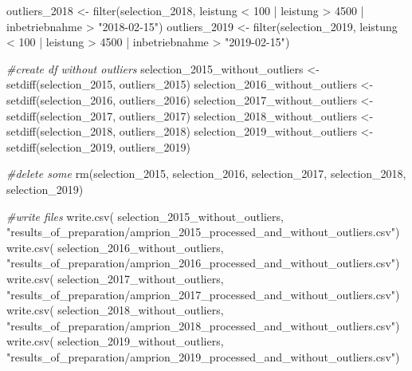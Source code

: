 \documentclass[a4paper,11pt]{article}
\newenvironment{Shaded}{\begin{snugshade}}{\end{snugshade}}
\newcommand{\CommentTok}[1]{\textcolor[rgb]{0.56,0.35,0.01}{\textit{#1}}}
\newcommand{\DecValTok}[1]{\textcolor[rgb]{0.00,0.00,0.81}{#1}}
\newcommand{\FunctionTok}[1]{\textcolor[rgb]{0.00,0.00,0.00}{#1}}
\newcommand{\NormalTok}[1]{#1}
\newcommand{\OtherTok}[1]{\textcolor[rgb]{0.56,0.35,0.01}{#1}}
\newcommand{\SpecialCharTok}[1]{\textcolor[rgb]{0.00,0.00,0.00}{#1}}
\newcommand{\StringTok}[1]{\textcolor[rgb]{0.31,0.60,0.02}{#1}}
\begin{document}
\begin{Shaded}
\begin{Highlighting}[]
\NormalTok{outliers\_2018 }\OtherTok{\textless{}{-}} \FunctionTok{filter}\NormalTok{(selection\_2018, leistung }\SpecialCharTok{\textless{}} \DecValTok{100} \SpecialCharTok{|}\NormalTok{ leistung }\SpecialCharTok{\textgreater{}} \DecValTok{4500} \SpecialCharTok{|} 
\NormalTok{                          inbetriebnahme }\SpecialCharTok{\textgreater{}} \StringTok{"2018{-}02{-}15"}\NormalTok{)}
\NormalTok{outliers\_2019 }\OtherTok{\textless{}{-}} \FunctionTok{filter}\NormalTok{(selection\_2019, leistung }\SpecialCharTok{\textless{}} \DecValTok{100} \SpecialCharTok{|}\NormalTok{ leistung }\SpecialCharTok{\textgreater{}} \DecValTok{4500} \SpecialCharTok{|} 
\NormalTok{                          inbetriebnahme }\SpecialCharTok{\textgreater{}} \StringTok{"2019{-}02{-}15"}\NormalTok{)}

\CommentTok{\#create df without outliers}
\NormalTok{selection\_2015\_without\_outliers }\OtherTok{\textless{}{-}} \FunctionTok{setdiff}\NormalTok{(selection\_2015, outliers\_2015)}
\NormalTok{selection\_2016\_without\_outliers }\OtherTok{\textless{}{-}} \FunctionTok{setdiff}\NormalTok{(selection\_2016, outliers\_2016)}
\NormalTok{selection\_2017\_without\_outliers }\OtherTok{\textless{}{-}} \FunctionTok{setdiff}\NormalTok{(selection\_2017, outliers\_2017)}
\NormalTok{selection\_2018\_without\_outliers }\OtherTok{\textless{}{-}} \FunctionTok{setdiff}\NormalTok{(selection\_2018, outliers\_2018)}
\NormalTok{selection\_2019\_without\_outliers }\OtherTok{\textless{}{-}} \FunctionTok{setdiff}\NormalTok{(selection\_2019, outliers\_2019)}

\CommentTok{\#delete some}
\FunctionTok{rm}\NormalTok{(selection\_2015, selection\_2016, selection\_2017, selection\_2018,}
\NormalTok{   selection\_2019)}

\CommentTok{\#write files}
\FunctionTok{write.csv}\NormalTok{(}
\NormalTok{  selection\_2015\_without\_outliers, }
  \StringTok{"results\_of\_preparation/amprion\_2015\_processed\_and\_without\_outliers.csv"}\NormalTok{)}
\FunctionTok{write.csv}\NormalTok{(}
\NormalTok{  selection\_2016\_without\_outliers, }
  \StringTok{"results\_of\_preparation/amprion\_2016\_processed\_and\_without\_outliers.csv"}\NormalTok{)}
\FunctionTok{write.csv}\NormalTok{(}
\NormalTok{  selection\_2017\_without\_outliers, }
  \StringTok{"results\_of\_preparation/amprion\_2017\_processed\_and\_without\_outliers.csv"}\NormalTok{)}
\FunctionTok{write.csv}\NormalTok{(}
\NormalTok{  selection\_2018\_without\_outliers, }
  \StringTok{"results\_of\_preparation/amprion\_2018\_processed\_and\_without\_outliers.csv"}\NormalTok{)}
\FunctionTok{write.csv}\NormalTok{(}
\NormalTok{  selection\_2019\_without\_outliers, }
  \StringTok{"results\_of\_preparation/amprion\_2019\_processed\_and\_without\_outliers.csv"}\NormalTok{)}


\end{Highlighting}
\end{Shaded}
\end{document}
